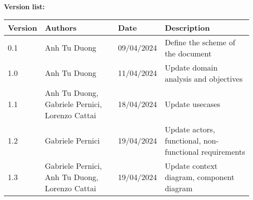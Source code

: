\textcolor{RFIGreen}{\Large\bf Version list:}


\begin{center}

{\setlength{\extrarowheight}{6pt}
\begin{tabular}{|p{1.5cm}|p{4.5cm}|p{2.5cm}|p{5.5cm}|}
\hline
{\small\bf Version} & {\small\bf Authors} & {\small\bf Date} & {\small\bf Description}\\
\hline
0.1 & Anh Tu Duong & 09/04/2024  & Define the scheme of the document \\
\hline
1.0 & Anh Tu Duong & 11/04/2024  & Update domain analysis and objectives \\
\hline
1.1 & Anh Tu Duong, Gabriele Pernici, Lorenzo Cattai & 18/04/2024  & Update usecases \\
\hline
1.2 & Gabriele Pernici & 19/04/2024  & Update actors, functional, non-functional requirements \\
\hline
1.3 & Gabriele Pernici, Anh Tu Duong, Lorenzo Cattai & 19/04/2024  & Update context diagram, component diagram \\
\end{tabular}
}

\end{center}

\newpage
